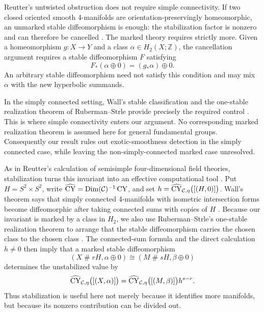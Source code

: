 Reutter's untwisted obstruction does not require simple connectivity.  If two
closed oriented smooth 4-manifolds are orientation-preservingly
homeomorphic, an unmarked stable diffeomorphism is enough: the stabilization
factor is nonzero and can therefore be cancelled \cite{Reutter2023}.  The
marked theory requires strictly more.  Given a homeomorphism
$g\colon X\to Y$ and a class $\alpha\in H_2(X;\mathbb Z)$, the cancellation
argument requires a stable diffeomorphism $F$ satisfying
\[
  F_*(\alpha\oplus0)=(g_*\alpha)\oplus0.
\]
An arbitrary stable diffeomorphism need not satisfy this condition and may mix
$\alpha$ with the new hyperbolic summands.

In the simply connected setting, Wall's stable classification and the
one-stable realization theorem of Ruberman--Strle provide precisely the
required control \cite{Wall1964,RubermanStrle2022}.  This is where simple
connectivity enters our argument.  No corresponding marked realization
theorem is assumed here for general fundamental groups.  Consequently our
result rules out exotic-smoothness detection in the simply connected case,
while leaving the non-simply-connected marked case unresolved.

As in Reutter's calculation of semisimple four-dimensional field theories,
stabilization turns this invariant into an effective computational tool
\cite[Theorem~A and Corollary~3.9]{Reutter2023}.  Put
$H=S^2\times S^2$, write
$\widehat{\operatorname{CY}}=\operatorname{Dim}(\mathcal{C})^{-1}\operatorname{CY}$, and set
$h=\widehat{\operatorname{CY}}_{\mathcal{C},\eta}\bigl([(H,0)]\bigr)$.  Wall's theorem says that simply connected
4-manifolds with isometric intersection forms become diffeomorphic after
taking connected sums with copies of $H$ \cite[Theorems~2--3]{Wall1964}.
Because our invariant is marked by a class in $H_2$, we also use
Ruberman--Strle's one-stable realization theorem to arrange that the stable
diffeomorphism carries the chosen class to the chosen class
\cite[Theorem~2.1]{RubermanStrle2022}.  The connected-sum formula and the
direct calculation $h\neq0$ then imply that a marked stable diffeomorphism
\[
  (X\mathbin{\#}rH,\alpha\oplus0)
  \cong (M\mathbin{\#}sH,\beta\oplus0)
\]
determines the unstabilized value by
\[
  \widehat{\operatorname{CY}}_{\mathcal{C},\eta}\bigl([(X,\alpha)]\bigr)
  =\widehat{\operatorname{CY}}_{\mathcal{C},\eta}\bigl([(M,\beta)]\bigr)h^{s-r}.
\]
Thus stabilization is useful here not merely because it identifies more
manifolds, but because its nonzero contribution can be divided out.

